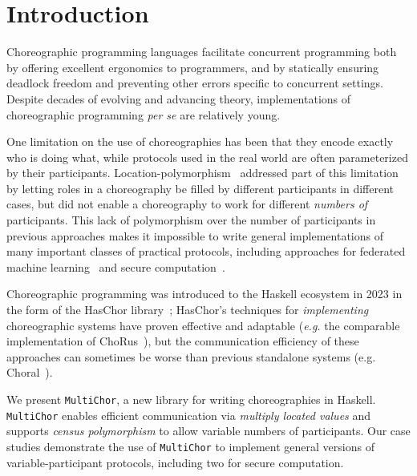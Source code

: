 \documentclass[sigplan,screen]{acmart}
\newcommand{\HasChor}{Has\-Chor\xspace}
\newcommand{\MultiChor}{\texttt{Multi\-Chor}\xspace}
\begin{document}
\section{Introduction}\label{sec:introduction}
Choreographic programming languages facilitate concurrent programming
both by offering excellent ergonomics to programmers,
and by statically ensuring deadlock freedom and preventing other errors
specific to concurrent settings.
Despite decades of evolving and advancing theory,
implementations of choreographic programming \textit{per se} are relatively young.

One limitation on the use of choreographies has been that they encode exactly who is doing what,
while protocols used in the real world are often
parameterized by their participants.
Location-polymorphism~\cite{graversen2023polychor} addressed part of this limitation
by letting roles in a choreography be filled by different participants in different cases,
but did not enable a choreography to work for different \emph{numbers of} participants.
This lack of polymorphism over the number of participants in previous approaches makes it impossible to write general implementations of many important classes of practical protocols, including approaches for federated machine learning~\cite{bonawitz2019towards, wu2020safa, li2021model} and secure computation~\cite{keller2020mp, corrigan2017prio, bonawitz2017practical, dprio2023, goldreich2019play}.

Choreographic programming was introduced to the Haskell ecosystem
in 2023 in the form of the \HasChor library~\cite{haschor};
\HasChor's techniques for \emph{implementing} choreographic systems have proven effective
and adaptable (\textit{e.g.} the comparable implementation of ChoRus~\cite{chorus}),
but the communication efficiency of these approaches can sometimes be worse than previous standalone systems (e.g. Choral~\cite{choral}).

We present \MultiChor, a new library for writing choreographies in Haskell. \MultiChor enables efficient communication via \emph{multiply located values} and supports \emph{census polymorphism} to allow variable numbers of participants. Our case studies demonstrate the use of \MultiChor to implement general versions of variable-participant protocols, including two for secure computation.
\end{document}
